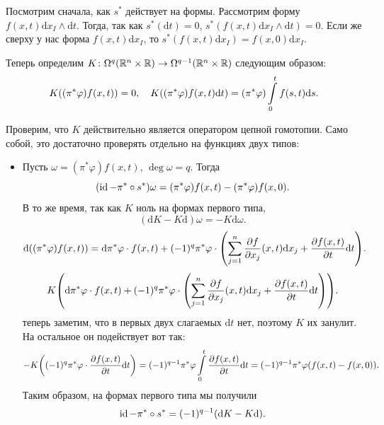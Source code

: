  		 Посмотрим сначала, как $s^*$ действует на формы. Рассмотрим форму $f(x, t) \mathrm{d}x_{I} \wedge \mathrm{d}t$. Тогда, так как $s^*(\mathrm{d}t) = 0$, $s^*(f(x, t) \mathrm{d}x_{I} \wedge \mathrm{d}t) = 0$. Если же сверху у нас форма $f(x, t) \mathrm{d}x_I$, то $s^*(f(x, t) \mathrm{d}x_I) = f(x, 0) \mathrm{d}x_I$. 

 		 Теперь определим $K\colon \Omega^q(\mathbb{R}^n \times \mathbb{R}) \to \Omega^{q - 1}(\mathbb{R}^n \times \mathbb{R})$ следующим образом: 
 		 \[
 		 	K\lr*{ (\pi^* \varphi) f(x, t) } = 0, \quad K\lr*{ (\pi^*\varphi) f(x, t) \mathrm{d}t } = (\pi^* \varphi) \int\limits_{0}^{t} f(s, t) \mathrm{d}s.
 		 \]

 		 Проверим, что $K$ действительно является оператором цепной гомотопии. Само собой, это достаточно проверять отдельно на функциях двух типов: 

 		 \begin{itemize}
 		 	\item Пусть $\omega = (\pi^* \varphi) f(x, t)$, $\deg{\omega} = q$. Тогда 
 		 	\[
 		 		(\operatorname{id} - \pi^* \circ s^*) \omega = (\pi^* \varphi) f(x, t) - (\pi^* \varphi) f(x, 0).
 		 	\]
 		 	В то же время, так как $K$ ноль на формах первого типа, 
 		 	\[
 		 		(\mathrm{d}K - K\mathrm{d})\omega = -K\mathrm{d}\omega.
 		 	\]
 		 	\[
 		 		\mathrm{d}\lr*{ (\pi^*\varphi)f(x, t) } = \mathrm{d}\pi^*\varphi \cdot f(x, t) + (-1)^q \pi^* \varphi \cdot \lr*{\sum_{j = 1}^n \frac{\partial f}{\partial x_j}(x, t) \mathrm{d}x_j + \frac{\partial f(x, t)}{\partial t} \mathrm{d}t}. 
 		 	\]
 		 	\[
 		 		K\lr*{ \mathrm{d}\pi^*\varphi \cdot f(x, t) + (-1)^q \pi^* \varphi \cdot \lr*{\sum_{j = 1}^n \frac{\partial f}{\partial x_j}(x, t) \mathrm{d}x_j + \frac{\partial f(x, t)}{\partial t} \mathrm{d}t} }.
 		 	\]
 		 	теперь заметим, что в первых двух слагаемых $\mathrm{d}t$ нет, поэтому $K$ их занулит. На остальное он подействует вот так: 
 		 	\[
 		 		-K\lr*{ (-1)^q \pi^* \varphi \cdot \frac{\partial f(x, t)}{\partial t} \mathrm{d}t } = (-1)^{q - 1} \pi^* \varphi \int\limits_{0}^t \frac{\partial f(x, t)}{\partial t} \mathrm{d}t = (-1)^{q - 1} \pi^* \varphi \lr*{ f(x, t) - f(x, 0) }. 
 		 	\]
 		 	Таким образом, на формах первого типа мы получили 
 		 	\[
 		 		\id - \pi^* \circ s^* = (-1)^{q - 1}\lr*{\mathrm{d}K - K \mathrm{d}}. 
 		 	\]


\end{itemize}
